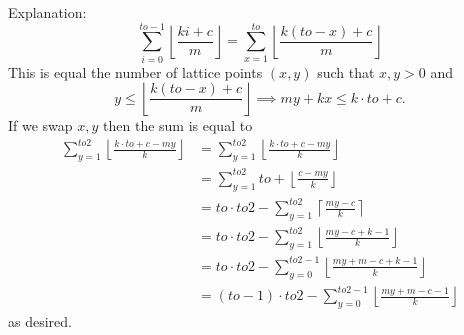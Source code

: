 Explanation:
$$\sum_{i=0}^{to-1}\left\lfloor \frac{ki+c}{m}\right\rfloor=\sum_{x=1}^{to}\left\lfloor \frac{k(to-x)+c}{m}\right\rfloor$$
This is equal the number of lattice points $(x,y)$ such that $x,y>0$ and
$$y\le \left\lfloor \frac{k(to-x)+c}{m}\right\rfloor\implies my+kx\le k\cdot to+c.$$
If we swap $x,y$ then the sum is equal to
\begin{align*}
\sum_{y=1}^{to2}\left\lfloor \frac{k\cdot to+c-my}{k}\right\rfloor&=\sum_{y=1}^{to2}\left\lfloor \frac{k\cdot to+c-my}{k}\right\rfloor\\
&=\sum_{y=1}^{to2}to+\left\lfloor \frac{c-my}{k}\right\rfloor\\
&=to\cdot to2-\sum_{y=1}^{to2}\left\lceil \frac{my-c}{k}\right\rceil\\
&=to\cdot to2-\sum_{y=1}^{to2}\left\lfloor \frac{my-c+k-1}{k}\right\rfloor\\
&=to\cdot to2-\sum_{y=0}^{to2-1}\left\lfloor \frac{my+m-c+k-1}{k}\right\rfloor\\
&=(to-1)\cdot to2-\sum_{y=0}^{to2-1}\left\lfloor \frac{my+m-c-1}{k}\right\rfloor
\end{align*}
as desired.